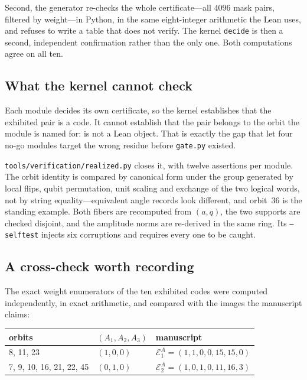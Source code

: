 \documentclass[11pt,a4paper]{article}
\newcommand{\lean}[1]{\texttt{#1}}
\theoremstyle{definition}
\begin{document}
Second, the generator re-checks the whole certificate---all $4096$ mask pairs,
filtered by weight---in Python, in the same eight-integer arithmetic the Lean
uses, and refuses to write a table that does not verify. The kernel
\lean{decide} is then a second, independent confirmation rather than the only
one. Both computations agree on all ten.

\subsection{What the kernel cannot check}

Each module decides its own certificate, so the kernel establishes that the
exhibited pair is a code. It cannot establish that the pair belongs to the
orbit the module is named for:  is not a Lean object.
That is exactly the gap that let four no-go modules target the wrong residue
before \lean{gate.py} existed.

\lean{tools/verification/realized.py} closes it, with twelve assertions per
module. The orbit identity is compared by canonical form under the group
generated by local flips, qubit permutation, unit scaling and exchange of the
two logical words, not by string equality---equivalent angle records look
different, and orbit~36 is the standing example. Both fibers are recomputed
from $(a,q)$, the two supports are checked disjoint, and the amplitude norms
are re-derived in the same ring. Its \lean{--selftest} injects six corruptions
and requires every one to be caught.

\subsection{A cross-check worth recording}

The exact weight enumerators of the ten exhibited codes were computed
independently, in exact arithmetic, and compared with the images the manuscript
claims:

\begin{center}
\begin{tabular}{lll}
\toprule
orbits & $(A_1,A_2,A_3)$ & manuscript \\
\midrule
8, 11, 23 & $(1,0,0)$ & $\mathcal E_1^A=(1,1,0,0,15,15,0)$ \\
7, 9, 10, 16, 21, 22, 45 & $(0,1,0)$ & $\mathcal E_2^A=(1,0,1,0,11,16,3)$ \\
\bottomrule
\end{tabular}
\end{center}
\end{document}
